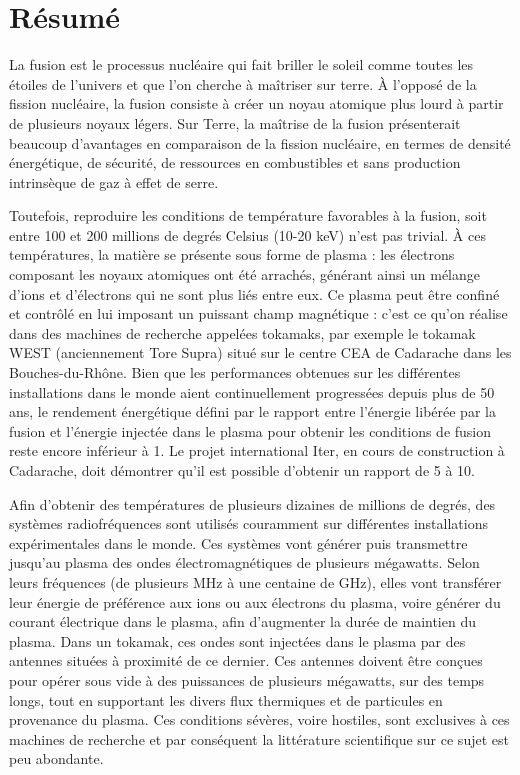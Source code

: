 \chapter*{Résumé}

La fusion est le processus nucléaire qui fait briller le soleil comme toutes les étoiles de l'univers et que l'on cherche à maîtriser sur terre. À l’opposé de la fission nucléaire, la fusion consiste à créer un noyau atomique plus lourd à partir de plusieurs noyaux légers. Sur Terre, la maîtrise de la fusion présenterait beaucoup d’avantages en comparaison de la fission nucléaire, en termes de densité énergétique, de sécurité, de ressources en combustibles et sans production intrinsèque de gaz à effet de serre. 

Toutefois, reproduire les conditions de température favorables à la fusion, soit entre 100 et 200 millions de degrés Celsius (10-20 keV) n’est pas trivial. À ces températures, la matière se présente sous forme de plasma : les électrons composant les noyaux atomiques ont été arrachés, générant ainsi un mélange d’ions et d’électrons qui ne sont plus liés entre eux. Ce plasma peut être confiné et contrôlé en lui imposant un puissant champ magnétique : c’est ce qu’on réalise dans des machines de recherche appelées tokamaks, par exemple le tokamak WEST (anciennement Tore Supra) situé sur le centre CEA de Cadarache dans les Bouches-du-Rhône. Bien que les performances obtenues sur les différentes installations dans le monde aient continuellement progressées depuis plus de 50 ans, le rendement énergétique défini par le rapport entre l'énergie libérée par la fusion et l'énergie injectée dans le plasma pour obtenir les conditions de fusion reste encore inférieur à 1. Le projet international Iter, en cours de construction à Cadarache, doit démontrer qu'il est possible d'obtenir un rapport de 5 à 10.

Afin d'obtenir des températures de plusieurs dizaines de millions de degrés, des systèmes radiofréquences sont utilisés couramment sur différentes installations expérimentales dans le monde. Ces systèmes vont générer puis transmettre jusqu'au plasma des ondes électromagnétiques de plusieurs mégawatts. Selon leurs fréquences (de plusieurs MHz à une centaine de GHz), elles vont transférer leur énergie de préférence aux ions ou aux électrons du plasma, voire générer du courant électrique dans le plasma, afin d'augmenter la durée de maintien du plasma. Dans un tokamak, ces ondes sont injectées dans le plasma par des antennes situées à proximité de ce dernier. Ces antennes doivent être conçues pour opérer sous vide à des puissances de plusieurs mégawatts, sur des temps longs, tout en supportant les divers flux thermiques et de particules en provenance du plasma. Ces conditions sévères, voire hostiles, sont exclusives à ces machines de recherche et par conséquent la littérature scientifique sur ce sujet est peu abondante.

